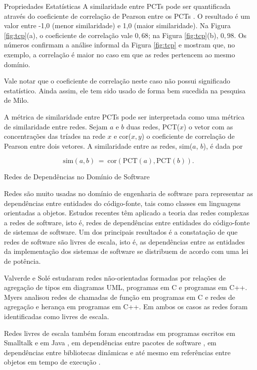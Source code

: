 \begin{section}{Propriedades Estatísticas}
A similaridade entre PCTs pode ser quantificada através do coeficiente de correlação de Pearson entre os PCTs \cite{Milo2004}. O resultado é um valor entre -1,0 (menor similaridade) e 1,0 (maior similaridade). Na Figura \ref{fig:tcp}(a), o coeficiente de correlação vale $0,68$; na Figura \ref{fig:tcp}(b), $0,98$. Os números confirmam a análise informal da Figura \ref{fig:tcp} e mostram que, no exemplo, a correlação é maior no caso em que as redes pertencem ao mesmo domínio.

Vale notar que o coeficiente de correlação neste caso não possui significado estatístico. Ainda assim, ele tem sido usado de forma bem sucedida na pesquisa de Milo.

A métrica de similaridade entre PCTs \cite{Milo2004} pode ser interpretada como uma métrica de similaridade entre redes. Sejam $a$ e $b$ duas redes, PCT($x$) o vetor com as concentrações das tríades na rede $x$ e cor($x, y$) o coeficiente de correlação de Pearson entre dois vetores. A similaridade entre as redes, sim($a$, $b$), é dada por

$$
\mathrm{sim}(a, b) ~=~ 
  \mathrm{cor}(\mathrm{PCT}(a), \mathrm{PCT}(b))\mathrm{.}
$$

\end{section}

\begin{section}{Redes de Dependências no Domínio de Software}

	Redes são muito usadas no domínio de engenharia de software para representar as dependências entre entidades do código-fonte, tais como classes em linguagens orientadas a objetos. 
	Estudos recentes têm aplicado a teoria das redes complexas a redes de software, isto é, redes de dependências entre entidades do código-fonte de sistemas de software. Um dos principais resultados é a constatação de que redes de software são livres de escala, isto é, as dependências entre as entidades da implementação dos sistemas de software se distribuem de acordo com uma lei de potência.
	
	Valverde e Solé \cite{Valverde2003} estudaram redes não-orientadas formadas por relações de agregação de tipos em diagramas UML, programas em C e programas em C++. Myers \cite{Myers2003} analisou redes de chamadas de função em programas em C e redes de agregação e herança em programas em C++. Em ambos os casos as redes foram identificadas como livres de escala. 

	Redes livres de escala também foram encontradas em programas escritos em Smalltalk \cite{Marchesi2004,Concas2007} e em Java \cite{Hyland-Wood2006,Baxter2006,Ichii2008}, em dependências entre pacotes de software \cite{Labelle2004}, em dependências entre bibliotecas dinâmicas \cite{Louridas2008} e até mesmo em referências entre objetos em tempo de execução \cite{Potanin2005}.
\end{section}

